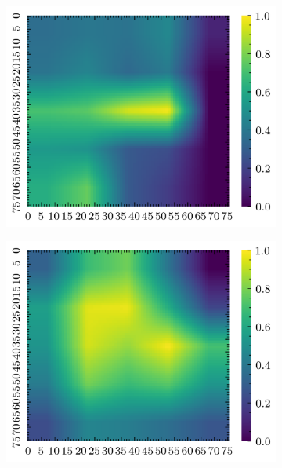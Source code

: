 \documentclass[../document.tex]{subfiles}
\begin{document}
\begin{figure}[H]
    \begin{subfigure}[b]{0.19\textwidth}
        \includegraphics[width=\linewidth]{../img/5/quarry/false_negative/grad-cam-2d-0.png}
    \end{subfigure}
    \begin{subfigure}[b]{0.19\textwidth}
        \includegraphics[width=\linewidth]{../img/5/quarry/false_negative/grad-cam-2d-1.png}
    \end{subfigure}  
    \begin{subfigure}[b]{0.19\textwidth}

\end{subfigure}
\end{figure}
\end{document}

